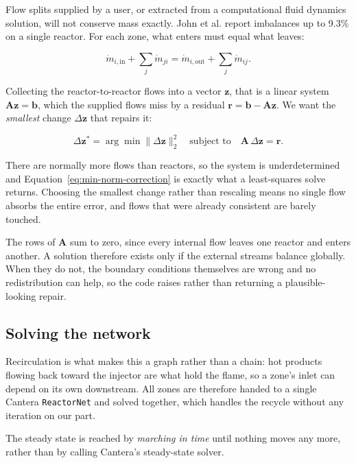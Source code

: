 \documentclass[11pt]{article}
\newcommand{\code}[1]{\nolinkurl{#1}}
\begin{document}
Flow splits supplied by a user, or extracted from a computational fluid dynamics
solution, will not conserve mass exactly. John et al. report imbalances up to 9.3\% on a
single reactor. For each zone, what enters must equal what leaves:

\begin{equation}
  \dot m_{i,\mathrm{in}}+\sum_j \dot m_{ji}
  =\dot m_{i,\mathrm{out}}+\sum_j \dot m_{ij}.
  \label{eq:reactor-mass-balance}
\end{equation}

Collecting the reactor-to-reactor flows into a vector $\mathbf z$, that is a linear
system $\mathbf{Az}=\mathbf b$, which the supplied flows miss by a residual
$\mathbf r=\mathbf b-\mathbf{Az}$. We want the \emph{smallest} change $\Delta\mathbf z$
that repairs it:

\begin{equation}
  \Delta\mathbf z^{*}=\arg\min\|\Delta\mathbf z\|_2^{2}
  \quad\text{subject to}\quad \mathbf A\,\Delta\mathbf z=\mathbf r.
  \label{eq:min-norm-correction}
\end{equation}

There are normally more flows than reactors, so the system is underdetermined and
Equation~\eqref{eq:min-norm-correction} is exactly what a least-squares solve returns.
Choosing the smallest change rather than rescaling means no single flow absorbs the
entire error, and flows that were already consistent are barely touched.

The rows of $\mathbf A$ sum to zero, since every internal flow leaves one reactor and
enters another. A solution therefore exists only if the external streams balance
globally. When they do not, the boundary conditions themselves are wrong and no
redistribution can help, so the code raises rather than returning a plausible-looking
repair.

\subsection{Solving the network}

Recirculation is what makes this a graph rather than a chain: hot products flowing back
toward the injector are what hold the flame, so a zone's inlet can depend on its own
downstream. All zones are therefore handed to a single Cantera \code{ReactorNet} and
solved together, which handles the recycle without any iteration on our part.

The steady state is reached by \emph{marching in time} until nothing moves any more,
rather than by calling Cantera's steady-state solver.
\end{document}
